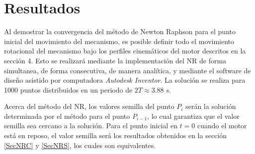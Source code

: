 \documentclass[12pt]{article}
\begin{document}
\section{Resultados}
Al demostrar la convergencia del método de Newton Raphson para el punto inicial del movimiento del mecanismo, es posible definir todo el movimiento rotacional del mecanismo bajo los perfiles cinemáticos del motor descritos en la sección 4. Esto se realizará mediante la implementación del NR de forma simultanea, de forma consecutiva, de manera analítica, y mediante el software de diseño asistido por computadora \textit{Autodesk Inventor}. La solución se realiza para 1000 puntos distribuidos en un periodo de $2T\approx3.88\;s$. 

Acerca del método del NR, los valores semilla del punto $P_{i}$ serán la solución determinada por el método para el punto $P_{i-1}$, lo cual garantiza que el valor semilla sea cercano a la solución. Para el punto inicial en $t=0$ cuando el motor está en reposo, el valor semilla será los resultados obtenidos en la sección \ref{SecNRC} y \ref{SecNRS}, los cuales son equivalentes.
\end{document}
